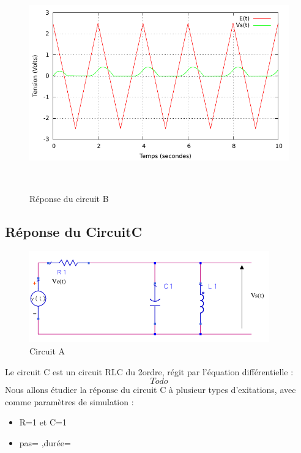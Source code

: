 \documentclass[a4paper,11pt]{article}
\begin{document}
\begin{figure}[h!]
\begin{minipage}[b]{0.5\linewidth}
   \end{minipage}
  \begin{minipage}[b]{0.5\linewidth}   
      \centering \includegraphics[scale=.68]{CBtriangle.pdf}
   \end{minipage}\\
 \caption{ Réponse du circuit B}
\end{figure}
\newpage
  \subsection{Réponse du CircuitC}

  \begin{figure}[H]
	 \begin{center}
	\includegraphics[scale=.7]{circuitTest}
	\caption{Circuit A}
	\end{center}
      \end{figure}
   Le circuit C est un circuit RLC du 2\ieme ordre, régit par l'équation différentielle :
   \begin{equation*}
    Todo
   \end{equation*}
  Nous allons étudier la réponse du circuit C à plusieur types d'exitations, avec comme paramètres de simulation :  \\
  \begin{itemize}
   \item R=1 et C=1
   \item pas= ,durée= 
  \end{itemize}
\end{document}
